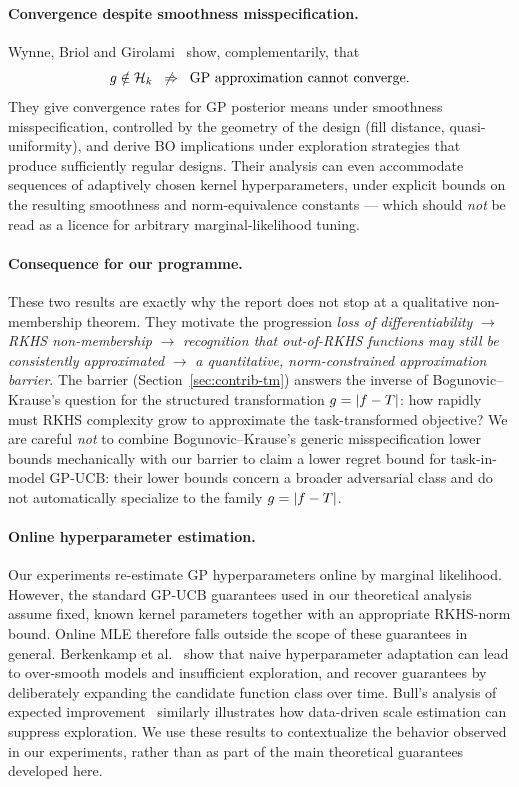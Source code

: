 \paragraph{Convergence despite smoothness misspecification.}
Wynne, Briol and Girolami~\cite{wynne2021} show, complementarily, that
\[
g\notin\mathcal{H}_k \;\;\not\Rightarrow\;\; \text{GP approximation cannot converge}.
\]
They give convergence rates for GP posterior means under smoothness
misspecification, controlled by the geometry of the design (fill distance,
quasi-uniformity), and derive BO implications under exploration strategies that
produce sufficiently regular designs. Their analysis can even accommodate
sequences of adaptively chosen kernel hyperparameters, under explicit bounds on
the resulting smoothness and norm-equivalence constants --- which should
\emph{not} be read as a licence for arbitrary marginal-likelihood tuning.
\hfill\Plit

\paragraph{Consequence for our programme.}
These two results are exactly why the report does not stop at a qualitative
non-membership theorem. They motivate the progression
\emph{loss of differentiability} $\to$ \emph{RKHS non-membership} $\to$
\emph{recognition that out-of-RKHS functions may still be consistently
approximated} $\to$ \emph{a quantitative, norm-constrained approximation
barrier}. The barrier (Section~\ref{sec:contrib-tm}) answers the inverse of
Bogunovic--Krause's question for the structured transformation $g=\left\lvert f-T\right\rvert$:
how rapidly must RKHS complexity grow to approximate the task-transformed
objective? We are careful \emph{not} to combine Bogunovic--Krause's generic
misspecification lower bounds mechanically with our barrier to claim a lower
regret bound for task-in-model GP-UCB: their lower bounds concern a broader
adversarial class and do not automatically specialize to the family
$g=\left\lvert f-T\right\rvert$. \hfill\Psynth

\paragraph{Online hyperparameter estimation.}
Our experiments re-estimate GP hyperparameters online by marginal likelihood. 
However, the standard GP-UCB guarantees used in our theoretical analysis assume
fixed, known kernel parameters together with an appropriate RKHS-norm bound.
Online MLE therefore falls outside the scope of these guarantees in general.
Berkenkamp et al.~\cite{berkenkamp2019} show that naive hyperparameter adaptation
can lead to over-smooth models and insufficient exploration, and recover
guarantees by deliberately expanding the candidate function class over time.
Bull's analysis of expected improvement~\cite{bull2011} similarly illustrates
how data-driven scale estimation can suppress exploration. We use these results
to contextualize the behavior observed in our experiments, rather than as part
of the main theoretical guarantees developed here.\hfill\Plit

